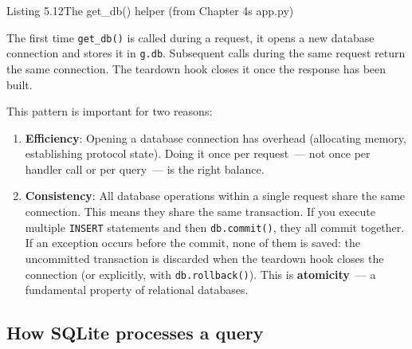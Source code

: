 \begin{codeboxcap}[short]{\textcolor{accent}{Listing 5.12}\enspace The get\_db() helper (from Chapter 4\textquotesingle s app.py)}

\begin{Shaded}
\begin{Highlighting}[]
       
\OperatorTok{=}
\OperatorTok{=}
\end{Highlighting}
\end{Shaded}

\end{codeboxcap}

\noindent{}The first time \texttt{get\_db()} is called during a request, it opens a new database connection and stores it in \texttt{g.db}. Subsequent calls during the same request return the same connection. The teardown hook closes it once the response has been built.

This pattern is important for two reasons:

\begin{enumerate}
\def\labelenumi{\arabic{enumi}.}
\item
  \textbf{Efficiency}: Opening a database connection has overhead (allocating memory, establishing protocol state). Doing it once per request~--- not once per handler call or per query~--- is the right balance.
\item
  \textbf{Consistency}: All database operations within a single request share the same connection. This means they share the same transaction. If you execute multiple \texttt{INSERT} statements and then \texttt{db.commit()}, they all commit together. If an exception occurs before the commit, none of them is saved: the uncommitted transaction is discarded when the teardown hook closes the connection (or explicitly, with \texttt{db.rollback()}). This is \textbf{atomicity}~--- a fundamental property of relational databases.
\end{enumerate}

\subsection*{How SQLite processes a query}\label{05-internal-request-execution:how-sqlite-processes-a-query}

